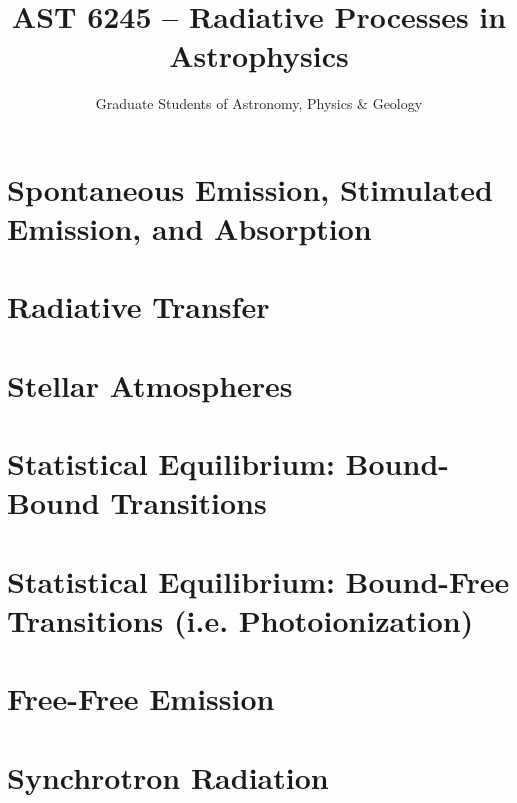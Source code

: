 \documentclass[11pt,letterpaper,notitlepage]{classnotes}
\author{Graduate Students of Astronomy, Physics \& Geology}
\title{AST 6245 -- Radiative Processes in  Astrophysics}
\begin{document}
\maketitle
\thispagestyle{empty}

\begin{center}
\end{center}
\vskip1cm

\noindent 


\newpage

\tableofcontents

\pagebreak
\chapter{Spontaneous Emission, Stimulated Emission, and Absorption}

\pagebreak

\chapter{Radiative Transfer}

\pagebreak
\chapter{Stellar Atmospheres}

\pagebreak
\chapter{Statistical Equilibrium: Bound-Bound Transitions}

\pagebreak
\chapter{Statistical Equilibrium: Bound-Free Transitions (i.e. Photoionization)}

\pagebreak
\chapter{Free-Free Emission}

\pagebreak
\chapter{Synchrotron Radiation}

\end{document}
